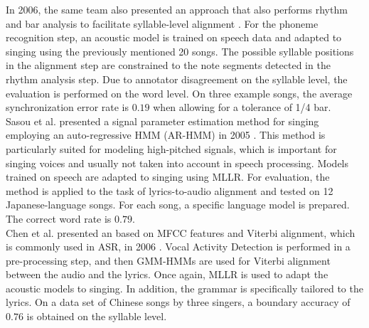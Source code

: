 In 2006, the same team also presented an approach that also performs rhythm and bar analysis to facilitate syllable-level alignment \cite{Iskandar:2006}. For the phoneme recognition step, an acoustic model is trained on speech data and adapted to singing using the previously mentioned 20 songs. The possible syllable positions in the alignment step are constrained to the note segments detected in the rhythm analysis step. Due to annotator disagreement on the syllable level, the evaluation is performed on the word level. On three example songs, the average synchronization error rate is $0.19$ when allowing for a tolerance of 1/4 bar.\\  

Sasou et al. presented a signal parameter estimation method for singing employing an auto-regressive HMM (AR-HMM) in 2005 \cite{Sasou2005AnAN}. This method is particularly suited for modeling high-pitched signals, which is important for singing voices and usually not taken into account in speech processing. Models trained on speech are adapted to singing using MLLR. For evaluation, the method is applied to the task of lyrics-to-audio alignment and tested on 12 Japanese-language songs. For each song, a specific language model is prepared. The correct word rate is $0.79$.\\

Chen et al. presented an based on MFCC features and Viterbi alignment, which is commonly used in ASR, in 2006 \cite{popular_synchronization}. Vocal Activity Detection is performed in a pre-processing step, and then GMM-HMMs are used for Viterbi alignment between the audio and the lyrics. Once again, MLLR is used to adapt the acoustic models to singing. In addition, the grammar is specifically tailored to the lyrics. On a data set of Chinese songs by three singers, a boundary accuracy of $0.76$ is obtained on the syllable level.\\

